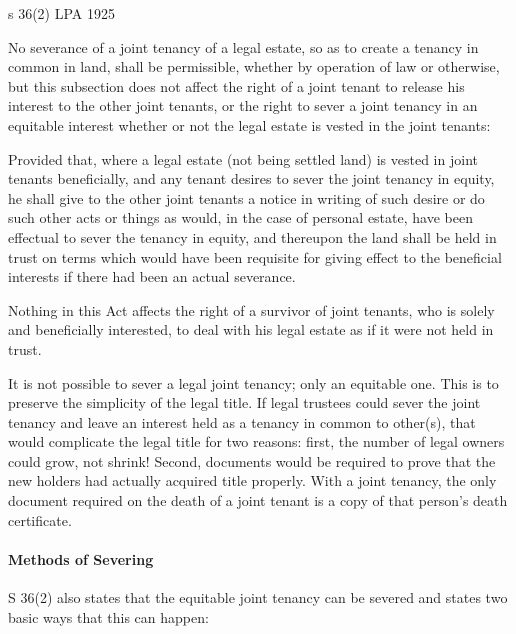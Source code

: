 \documentclass[
]{article}
\newenvironment{env-9843ce55-0506-497d-95ba-03a690b05b3c}
{
    \savenotes\tcolorbox[blanker,breakable,left=5pt,borderline west={2pt}{-4pt}{green}]
}
{
    \endtcolorbox\spewnotes
}
\begin{document}
\begin{env-9843ce55-0506-497d-95ba-03a690b05b3c}

s 36(2) LPA 1925

No severance of a joint tenancy of a legal estate, so as to create a
tenancy in common in land, shall be permissible, whether by operation of
law or otherwise, but this subsection does not affect the right of a
joint tenant to release his interest to the other joint tenants, or the
right to sever a joint tenancy in an equitable interest whether or not
the legal estate is vested in the joint tenants:

Provided that, where a legal estate (not being settled land) is vested
in joint tenants beneficially, and any tenant desires to sever the joint
tenancy in equity, he shall give to the other joint tenants a notice in
writing of such desire or do such other acts or things as would, in the
case of personal estate, have been effectual to sever the tenancy in
equity, and thereupon the land shall be held in trust on terms which
would have been requisite for giving effect to the beneficial interests
if there had been an actual severance.

Nothing in this Act affects the right of a survivor of joint tenants,
who is solely and beneficially interested, to deal with his legal estate
as if it were not held in trust.

\end{env-9843ce55-0506-497d-95ba-03a690b05b3c}

It is not possible to sever a legal joint tenancy; only an equitable
one. This is to preserve the simplicity of the legal title. If legal
trustees could sever the joint tenancy and leave an interest held as a
tenancy in common to other(s), that would complicate the legal title for
two reasons: first, the number of legal owners could grow, not shrink!
Second, documents would be required to prove that the new holders had
actually acquired title properly. With a joint tenancy, the only
document required on the death of a joint tenant is a copy of that
person's death certificate.

\hypertarget{methods-of-severing}{%
\paragraph{Methods of Severing}\label{methods-of-severing}}

S 36(2) also states that the equitable joint tenancy can be severed and
states two basic ways that this can happen:
\end{document}
